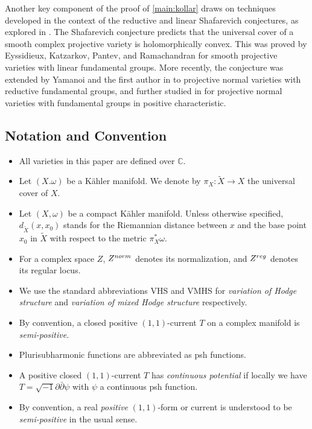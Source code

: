 \documentclass[11pt,a4paper,english]{smfart}
\theoremstyle{plain}
\theoremstyle{definition}
\theoremstyle{plain}
\def\hess{\sqrt{-1}\partial\bar{\partial}}
\def\C{\mathbb{C}}
\def\bC{\mathbb{C}}
\begin{document}
Another key component of the proof of \cref{main:kollar} draws on techniques developed in the context of the reductive and linear Shafarevich conjectures, as explored  in \cite{DY23, Eys04, EKPR12}. The Shafarevich conjecture predicts that the universal cover of a smooth complex projective variety is holomorphically convex. This was proved by Eyssidieux, Katzarkov, Pantev, and Ramachandran \cite{Eys04, EKPR12} for smooth projective varieties with linear fundamental groups. More recently, the conjecture was extended by Yamanoi and the first author in \cite{DY23} to projective normal varieties with reductive fundamental groups, and further studied in \cite{DY24} for projective normal varieties with fundamental groups in positive characteristic.
	
	
	
	
	\subsection{Notation and Convention}
	\begin{itemize}
	\item All varieties in this paper are defined over $\C$.
		\item Let $(X.\omega)$ be a K\"ahler manifold. We denote by $\pi_X:\widetilde{X}\to X$ the universal cover of $X$.  
		\item Let $(X,\omega)$ be a compact K\"ahler manifold. Unless otherwise specified, $d_{\widetilde{X}}(x, x_0)$ stands for the Riemannian distance between $x$ and the base point $x_0$ in $\widetilde{X}$ with respect to the metric $\pi_X^*\omega$. %
		\item For a complex space $Z$, $Z^{\rm norm}$ denotes its normalization, and $Z^{\rm reg}$ denotes its regular locus. 
		\item We use the standard abbreviations VHS and VMHS for \emph{variation of Hodge structure} and \emph{variation of mixed Hodge structure} respectively.
		\item By convention, a closed positive $(1,1)$-current $T$ on a complex manifold is   \emph{semi-positive}. 
		\item Plurisubharmonic functions  are  abbreviated as psh functions. 
		\item A positive closed $(1,1)$-current $T$  has \emph{continuous potential} if locally we have $T=\hess\psi$ with $\psi$  a continuous psh function. 
		\item By convention, a real \emph{positive} \( (1,1) \)-form or current is understood to be \emph{semi-positive} in the usual sense. 
	\end{itemize}
\end{document}

